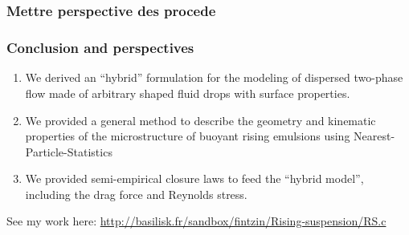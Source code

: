 \documentclass{sintefbeamer}
\begin{document}
\section*{}

\begin{frame}
  \frametitle{Mettre perspective des procede}

  

\end{frame}

\begin{frame}
  \frametitle{Conclusion and perspectives}

  \begin{enumerate}
    \item We derived an ``hybrid'' formulation for the  modeling of dispersed two-phase flow made of arbitrary shaped fluid drops with surface properties. 
    \item We provided a general method to describe the  geometry and kinematic properties of the microstructure of buoyant rising emulsions using Nearest-Particle-Statistics
    \item We provided semi-empirical closure laws to feed the ``hybrid model'',  including the drag force and Reynolds stress. 
  \end{enumerate}
\vfill    
See my work here: \url{http://basilisk.fr/sandbox/fintzin/Rising-suspension/RS.c}

\end{frame}


 
\end{document}
